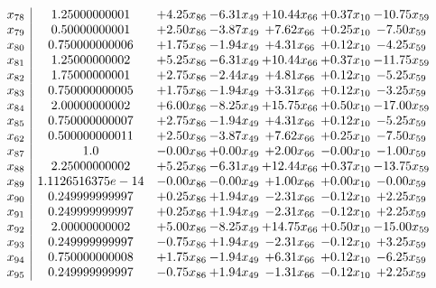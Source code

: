 \documentclass[8pt]{article}
\begin{document}
\[\begin{array}{c| c c@{\hskip 2pt} c@{\hskip 2pt} c@{\hskip 2pt} c@{\hskip 2pt} c@{\hskip 2pt} }
 x_{78}   &  1.25000000001 & +  4.25 x_{86} & -6.31 x_{49} & + 10.44 x_{66} & +  0.37 x_{10} & -10.75 x_{59}\\
 x_{79}   &  0.50000000001 & +  2.50 x_{86} & -3.87 x_{49} & +  7.62 x_{66} & +  0.25 x_{10} & -7.50 x_{59}\\
 x_{80}   &  0.750000000006 & +  1.75 x_{86} & -1.94 x_{49} & +  4.31 x_{66} & +  0.12 x_{10} & -4.25 x_{59}\\
 x_{81}   &  1.25000000002 & +  5.25 x_{86} & -6.31 x_{49} & + 10.44 x_{66} & +  0.37 x_{10} & -11.75 x_{59}\\
 x_{82}   &  1.75000000001 & +  2.75 x_{86} & -2.44 x_{49} & +  4.81 x_{66} & +  0.12 x_{10} & -5.25 x_{59}\\
 x_{83}   &  0.750000000005 & +  1.75 x_{86} & -1.94 x_{49} & +  3.31 x_{66} & +  0.12 x_{10} & -3.25 x_{59}\\
 x_{84}   &  2.00000000002 & +  6.00 x_{86} & -8.25 x_{49} & + 15.75 x_{66} & +  0.50 x_{10} & -17.00 x_{59}\\
 x_{85}   &  0.750000000007 & +  2.75 x_{86} & -1.94 x_{49} & +  4.31 x_{66} & +  0.12 x_{10} & -5.25 x_{59}\\
 x_{62}   &  0.500000000011 & +  2.50 x_{86} & -3.87 x_{49} & +  7.62 x_{66} & +  0.25 x_{10} & -7.50 x_{59}\\
 x_{87}   &  1.0 & -0.00 x_{86} & +  0.00 x_{49} & +  2.00 x_{66} & -0.00 x_{10} & -1.00 x_{59}\\
 x_{88}   &  2.25000000002 & +  5.25 x_{86} & -6.31 x_{49} & + 12.44 x_{66} & +  0.37 x_{10} & -13.75 x_{59}\\
 x_{89}   &  1.1126516375e-14 & -0.00 x_{86} & -0.00 x_{49} & +  1.00 x_{66} & +  0.00 x_{10} & -0.00 x_{59}\\
 x_{90}   &  0.249999999997 & +  0.25 x_{86} & +  1.94 x_{49} & -2.31 x_{66} & -0.12 x_{10} & +  2.25 x_{59}\\
 x_{91}   &  0.249999999997 & +  0.25 x_{86} & +  1.94 x_{49} & -2.31 x_{66} & -0.12 x_{10} & +  2.25 x_{59}\\
 x_{92}   &  2.00000000002 & +  5.00 x_{86} & -8.25 x_{49} & + 14.75 x_{66} & +  0.50 x_{10} & -15.00 x_{59}\\
 x_{93}   &  0.249999999997 & -0.75 x_{86} & +  1.94 x_{49} & -2.31 x_{66} & -0.12 x_{10} & +  3.25 x_{59}\\
 x_{94}   &  0.750000000008 & +  1.75 x_{86} & -1.94 x_{49} & +  6.31 x_{66} & +  0.12 x_{10} & -6.25 x_{59}\\
 x_{95}   &  0.249999999997 & -0.75 x_{86} & +  1.94 x_{49} & -1.31 x_{66} & -0.12 x_{10} & +  2.25 x_{59}\\

\end{array}\]
\end{document}
